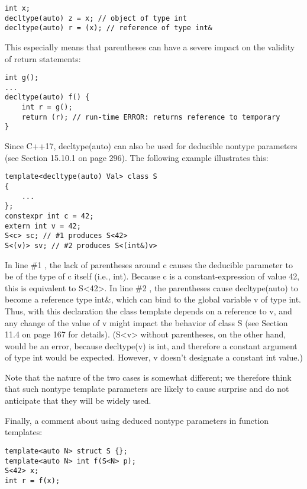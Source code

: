 \begin{lstlisting}[style=styleCXX]
int x;
decltype(auto) z = x; // object of type int
decltype(auto) r = (x); // reference of type int&
\end{lstlisting}

This especially means that parentheses can have a severe impact on the validity of return statements:

\begin{lstlisting}[style=styleCXX]
int g();
...
decltype(auto) f() {
	int r = g();
	return (r); // run-time ERROR: returns reference to temporary
}
\end{lstlisting}

Since C++17, decltype(auto) can also be used for deducible nontype parameters (see Section 15.10.1 on page 296). The following example illustrates this:

\begin{lstlisting}[style=styleCXX]
template<decltype(auto) Val> class S
{
	...
};
constexpr int c = 42;
extern int v = 42;
S<c> sc; // #1 produces S<42>
S<(v)> sv; // #2 produces S<(int&)v>
\end{lstlisting}

In line \#1 , the lack of parentheses around c causes the deducible parameter to be of the type of c itself (i.e., int). Because c is a constant-expression of value 42, this is equivalent to S<42>. In line \#2 , the parentheses cause decltype(auto) to become a reference type int\&, which can bind to the global variable v of type int. Thus, with this declaration the class template depends on a reference to v, and any change of the value of v might impact the behavior of class S (see Section 11.4 on page 167 for details). (S<v> without parentheses, on the other hand, would be an error, because decltype(v) is int, and therefore a constant argument of type int would be expected. However, v doesn’t designate a constant int value.)

Note that the nature of the two cases is somewhat different; we therefore think that such nontype template parameters are likely to cause surprise and do not anticipate that they will be widely used.

Finally, a comment about using deduced nontype parameters in function templates:

\begin{lstlisting}[style=styleCXX]
template<auto N> struct S {};
template<auto N> int f(S<N> p);
S<42> x;
int r = f(x);
\end{lstlisting}

